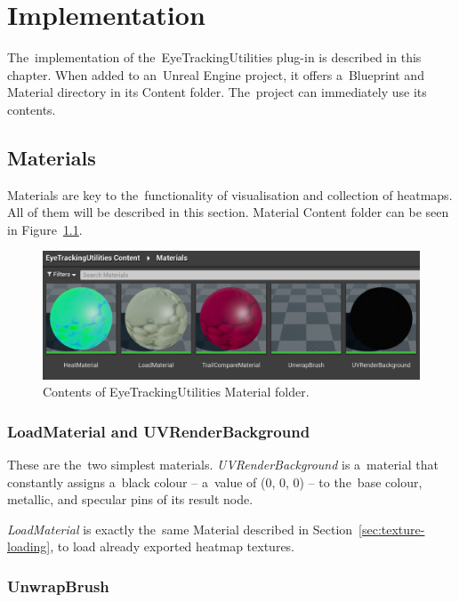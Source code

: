 \chapter{Implementation}
\label{chap:implementation}
\begin{chapterabstract}
The~implementation of the~EyeTrackingUtilities plug-in is described in this chapter. When added to an~Unreal Engine project, it offers a~Blueprint and Material directory in its Content folder. The~project can immediately use its contents.
\end{chapterabstract}

\section{Materials}

Materials are key to the~functionality of visualisation and collection of heatmaps. All of them will be described in this section. Material Content folder can be seen in Figure~\ref{fig:material-folder}.

\begin{figure}[!ht]\centering
    \includegraphics[width=\textwidth]{img/plugin-materials.png}
    \caption{Contents of EyeTrackingUtilities Material folder.}
    \label{fig:material-folder}
\end{figure}

\subsection{LoadMaterial and UVRenderBackground}
These are the~two simplest materials. \emph{UVRenderBackground} is a~material that constantly assigns a~black colour -- a~value of (0, 0, 0) -- to the~base colour, metallic, and specular pins of its result node.

\emph{LoadMaterial} is exactly the~same Material described in Section~\ref{sec:texture-loading}, to load already exported heatmap textures.
\pagebreak{}

\subsection{UnwrapBrush}
\label{sec:unwrap-brush-implementation}

